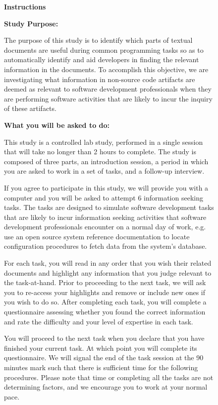 

\begin{figure}
\begin{mdframed}[backgroundcolor=gray!04] 
\begin{footnotesize}

{\large \textbf{Instructions}} \bigskip


\textbf{Study Purpose:} \medskip

The purpose of this study is to identify which parts of textual documents are useful during common programming tasks so as to automatically identify and aid developers in finding the relevant information in the documents. To accomplish this objective, we are investigating what information in non-source code artifacts are deemed as relevant to software development professionals when they are performing software activities that are likely to incur the inquiry of these artifacts. \medskip

\textbf{What you will be asked to do:} \medskip


This study is a controlled lab study, performed in a single session that will take no longer than 2 hours to complete. The study is composed of three parts, an introduction session, a period in which you are asked to work in a set of tasks, and a follow-up interview.  \medskip

If you agree to participate in this study, we will provide you with a computer and you will be asked to attempt 6 information seeking tasks. The tasks are designed to simulate software development tasks that are likely to incur information seeking activities that software development professionals encounter on a normal day of work, e.g. use an open source system reference documentation to locate configuration procedures to fetch data from the system’s database.  \medskip

For each task, you will read in any order that you wish their related documents and highlight any information that you judge relevant to the task-at-hand. Prior to proceeding to the next task, we will ask you to re-access your highlights and remove or include new ones if you wish to do so. After completing each task, you will complete a questionnaire assessing whether you found the correct information and rate the difficulty and your level of expertise in each task.  \medskip

You will proceed to the next task when you declare that you have finished your current task. At which point you will complete its questionnaire. We will signal the end of the task session at the 90 minutes mark such that there is sufficient time for the following procedures. Please note that time or completing all the tasks are not determining factors, and we encourage you to work at your normal pace.  \medskip


\end{footnotesize}
\end{mdframed}
\end{figure}

